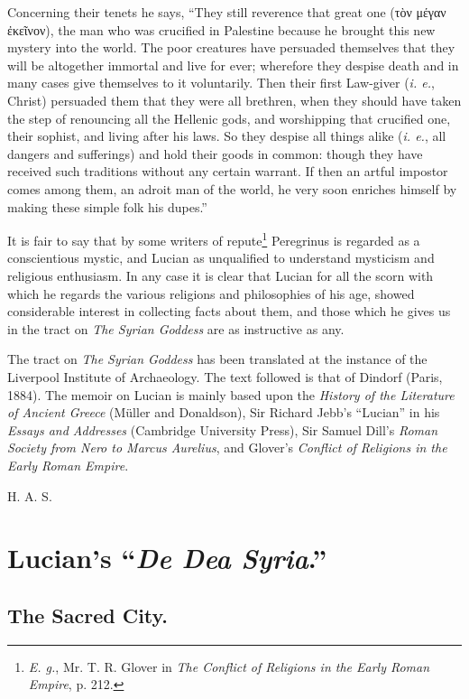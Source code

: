 \documentclass[a4paper, 11pt, oneside, polutonikogreek, english]{article}
\begin{document}
Concerning their tenets he says, ``They still reverence that great one (τὸν μέγαν ἐκεῖνον), the man who was crucified in Palestine because he brought this new mystery into the world. The poor creatures have persuaded themselves that they will be altogether immortal and live for ever; wherefore they despise death and in many cases give themselves to it voluntarily. Then their first Law-giver (\emph{i. e.}, Christ) persuaded them that they were all brethren, when they should have taken the step of renouncing all the Hellenic gods, and worshipping that crucified one, their sophist, and living after his laws. So they despise all things alike (\emph{i. e.}, all dangers and sufferings) and hold their goods in common: though they have received such traditions without any certain warrant. If then an artful impostor comes among them, an adroit man of the world, he very soon enriches himself by making these simple folk his dupes.''

It is fair to say that by some writers of repute\footnote{\emph{E. g.}, Mr. T. R. Glover in \emph{The Conflict of Religions in the Early Roman Empire}, p. 212.} Peregrinus is regarded as a conscientious mystic, and Lucian as unqualified to understand mysticism and religious enthusiasm. In any case it is clear that Lucian for all the scorn with which he regards the various religions and philosophies of his age, showed considerable interest in collecting facts about them, and those which he gives us in the tract on \emph{The Syrian Goddess} are as instructive as any.

The tract on \emph{The Syrian Goddess} has been translated at the instance of the Liverpool Institute of Archaeology. The text followed is that of Dindorf (Paris, 1884). The memoir on Lucian is mainly based upon the \emph{History of the Literature of Ancient Greece} (Müller and Donaldson), Sir Richard Jebb's ``Lucian'' in his \emph{Essays and Addresses} (Cambridge University Press), Sir Samuel Dill's \emph{Roman Society from Nero to Marcus Aurelius}, and Glover's \emph{Conflict of Religions in the Early Roman Empire}.

H. A. S.
\clearpage
\section{Lucian's ``\emph{De Dea Syria}.''}
\subsection{The Sacred City.}
\end{document}
